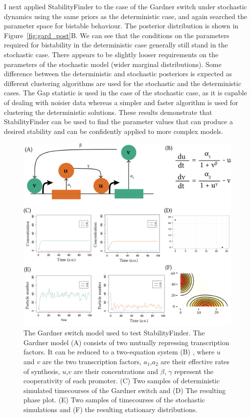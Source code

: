 I next applied StabilityFinder to the case of the Gardner switch under stochastic dynamics using the same priors as the deterministic case, and again searched the parameter space for bistable behaviour. The posterior distribution is shown in Figure~\ref{fig:gard_post}B. We can see that the conditions on the parameters required for bistability in the deterministic case generally still stand in the stochastic case. There appears to be slightly looser requirements on the parameters of the stochastic model (wider marginal distributions). Some difference between the deterministic and stochastic posteriors is expected as different clustering algorithms are used for the stochastic and the deterministic cases. The Gap statistic is used in the case of the stochastic case, as it is capable of dealing with noisier data whereas a simpler and faster algorithm is used for clustering the deterministic solutions. These results demonstrate that StabilityFinder can be used to find the parameter values that can produce a desired stability and can be confidently applied to more complex models.


\begin{figure}[htbp]
\begin{center}
	\includegraphics[scale=0.8]{../../chapters/chapterStabilityFinder/images/gardner_model.png}
	\caption[StabilityFinder used on the Gardner toggle switch]{\label{fig:gard_mod} The Gardner switch model used to test StabilityFinder. The Gardner model (A) consists of two mutually repressing transcription factors. It can be reduced to a two-equation system (B) , where $u$ and $v$ are the two transcription factors, $a_1$,$a_2$ are their effective rates of synthesis, $u$,$v$ are their concentrations and $\beta$, $\gamma$ represent the cooperativity of each promoter. (C) Two samples of deterministic simulated timecourses of the Gardner switch and (D) The resulting phase plot. (E) Two samples of timecourses of the stochastic simulations and (F) the resulting stationary distributions.}
\end{center}
\end{figure}

